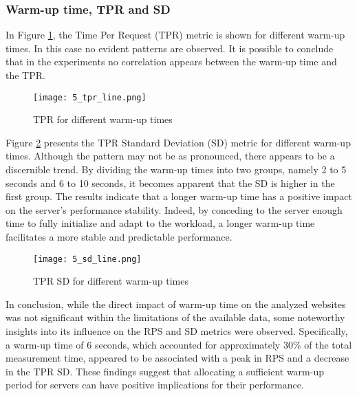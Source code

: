 \subsubsection{Warm-up time, TPR and SD}
In Figure \ref{fig:5_tpr_line}, the Time Per Request (TPR) metric is shown for different warm-up times. In this case no evident patterns
are observed. It is possible to conclude that in the experiments no correlation appears between the warm-up time and the TPR.\\

    \begin{figure}[H]
        \centering
        \texttt{[image: 5\_tpr\_line.png]}
        \caption{\small TPR for different warm-up times}
        \label{fig:5_tpr_line}
    \end{figure}
\noindent
Figure \ref{fig:5_sd_line} presents the TPR Standard Deviation (SD) metric for different warm-up times. Although the pattern may 
not be as pronounced, there appears to be a discernible trend. By dividing the warm-up times into two groups, namely 2 to 5 
seconds and 6 to 10 seconds, it becomes apparent that the SD is higher in the first group. The results indicate that a longer 
warm-up time has a positive impact on the server's performance stability. Indeed, by conceding to the server enough time 
to fully initialize and adapt to the workload, a longer warm-up time facilitates a more stable and predictable performance.

    \begin{figure}[H]
        \centering
        \texttt{[image: 5\_sd\_line.png]}
        \caption{\small TPR SD for different warm-up times}
        \label{fig:5_sd_line}
    \end{figure}

    In conclusion, while the direct impact of warm-up time on the analyzed websites was not significant within the limitations 
    of the available data, some noteworthy insights into its influence on the RPS and SD metrics were observed. Specifically, 
    a warm-up time of 6 seconds, which accounted for approximately 30\% of the total measurement time, appeared to be associated 
    with a peak in RPS and a decrease in the TPR SD.
    These findings suggest that allocating a sufficient warm-up period for servers can have positive implications for their performance.\\



